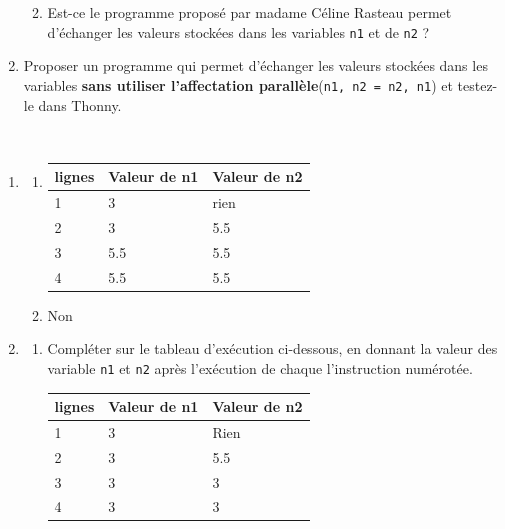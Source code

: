 \documentclass[a4paper,12pt]{article}
\begin{document}
\begin{enumerate}
\begin{enumerate}[label=\alph*.]
\begin{center}
\begin{tabular}{|l|p{5cm}|p{5cm}|}
			\end{tabular}
		\end{center}
		\item Est-ce le programme proposé par madame Céline Rasteau permet d'échanger les valeurs stockées dans les variables \lstinline{n1} et de \lstinline{n2} ?		
	\end{enumerate}
	\item  Proposer un programme qui permet d'échanger les valeurs stockées dans les variables \textbf{sans utiliser l'affectation parallèle}(\lstinline{n1, n2 = n2, n1}) et testez-le dans Thonny.
\end{enumerate}

\begin{correction}
	~\\ 
	\begin{enumerate}
		\item 
		\begin{enumerate}[label=\alph*.]
			\item 
			\begin{center}
				\begin{tabular}{|l|p{5cm}|p{5cm}|}
					\hline
					\rowcolor[HTML]{EFEFEF} 
					lignes & Valeur de n1  & Valeur de n2  \\ \hline
					1&         3 &         rien     \\ \hline
					2&         3  &        5.5      \\ \hline
					3&        5.5  &       5.5       \\ \hline
					4&        5.5  &       5.5       \\ \hline
					
				\end{tabular}
			\end{center}
			\item Non
		\end{enumerate}
		
		\item 
		\begin{enumerate}[label=\alph*.]
			\item Compléter sur le tableau d'exécution ci-dessous, en donnant la valeur des variable \lstinline{n1} et \lstinline{n2} après l'exécution de chaque l'instruction numérotée.
			\begin{center}
				\begin{tabular}{|l|p{5cm}|p{5cm}|}
					\hline
					\rowcolor[HTML]{EFEFEF} 
					lignes & Valeur de n1  & Valeur de n2  \\ \hline
					1&    3      &      Rien        \\ \hline
					2&    3      &     5.5         \\ \hline
					3&    3      &     3         \\ \hline
					4&    3      &      3        \\ \hline
					

\end{tabular}
\end{center}
\end{enumerate}
\end{enumerate}
\end{correction}
\end{document}
